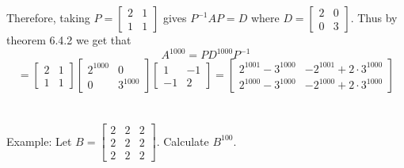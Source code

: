 \documentclass[10pt,letter]{article}
\begin{document}
Therefore, taking $P=\begin{bmatrix}2&1\\1&1\end{bmatrix}$ gives $P^{-1}AP=D$ where $D=\begin{bmatrix}2&0\\0&3\end{bmatrix}$. Thus by theorem 6.4.2 we get that $$A^{1000}=PD^{1000}P^{-1}$$ $$=\begin{bmatrix}2&1\\1&1\end{bmatrix}\begin{bmatrix}2^{1000}&0\\0&3^{1000}\end{bmatrix}\begin{bmatrix}1&-1\\-1&2\end{bmatrix} = \begin{bmatrix}2^{1001}-3^{1000}&-2^{1001}+2\cdot3^{1000}\\2^{1000}-3^{1000}&-2^{1000}+2\cdot3^{1000}\end{bmatrix}$$\\ \\ 
Example: Let $B=\begin{bmatrix}2&2&2\\2&2&2\\2&2&2\end{bmatrix}$. Calculate $B^{100}$. 
\end{document}
